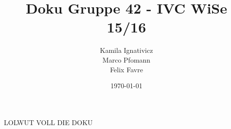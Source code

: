 \documentclass[paper=a4]{scrartcl}
\begin{document}
  \title{Doku Gruppe 42 - IVC WiSe 15/16}
  \author{Kamila Ignativicz\\ Marco Pfomann \\ Felix Favre}
  \date{\today}
  \maketitle

LOLWUT VOLL DIE DOKU
\end{document}
